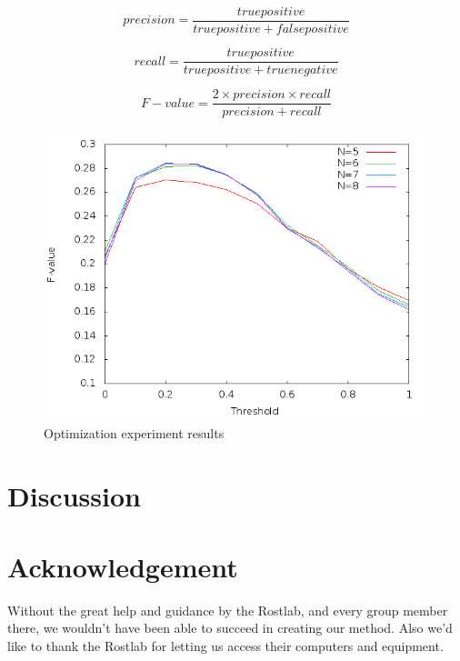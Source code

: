 \documentclass{bioinfo}
\begin{document}
\begin{equation}
precision = \frac{true positive}{true positive + false positive}
\label{eq:02}
\end{equation}

\begin{equation}
recall = \frac{true positive}{true positive + true negative}
\label{eq:03}
\end{equation}

\begin{equation}
F-value = \frac{2 \times precision \times recall}{precision + recall}
\label{eq:04}
\end{equation}

\begin{figure}[!tpb]
\centerline{\includegraphics[scale=0.4]{bilder/optim.png}}
\caption{Optimization experiment results}
\label{optim}
\end{figure}

\section{Discussion}


\section*{Acknowledgement}
Without the great help and guidance by the Rostlab, and every group member there, we wouldn't have been able to succeed in creating our method. Also we'd like to thank the Rostlab for letting us access their computers and equipment.
\end{document}
